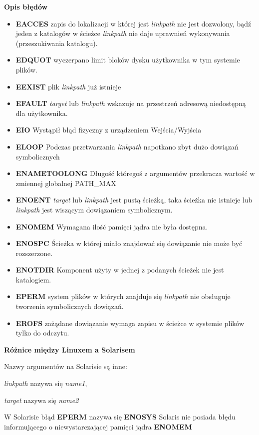\documentclass{article}
\begin{document}
\textbf{Opis błędów}
\begin{itemize}
\item \textbf{EACCES} zapis do lokalizacji w której jest \textit{linkpath} nie jest dozwolony, bądź jeden z katalogów w ścieżce \textit{linkpath} nie daje uprawnień wykonywania (przeszukiwania katalogu).
\item \textbf{EDQUOT} wyczerpano limit bloków dysku użytkownika w tym systemie plików.
\item \textbf{EEXIST} plik \textit{linkpath} już istnieje
\item \textbf{EFAULT} \textit{target} lub  \textit{linkpath} wskazuje na przestrzeń adresową niedostępną dla użytkownika.
\item \textbf{EIO} Wystąpił błąd fizyczny z urządzeniem Wejścia/Wyjścia
\item \textbf{ELOOP} Podczas przetwarzania \textit{linkpath} napotkano zbyt dużo dowiązań symbolicznych
\item \textbf{ENAMETOOLONG} Długość któregoś z argumentów 
przekracza wartość w zmiennej globalnej PATH\_MAX
\item \textbf{ENOENT}  \textit{target} lub \textit{linkpath} jest pustą ścieżką, taka ścieżka nie istnieje lub \textit{linkpath} jest wiszącym dowiązaniem symbolicznym. 
\item \textbf{ENOMEM}  Wymagana ilość pamięci jądra nie była dostępna.
\item \textbf{ENOSPC}  Ścieżka w której miało znajdować się dowiązanie nie może być rozszerzone.
\item \textbf{ENOTDIR}  Komponent użyty w jednej z podanych ścieżek nie jest katalogiem.
\item \textbf{EPERM} system plików w których znajduje się \textit{linkpath} nie obsługuje tworzenia symbolicznych dowiązań.
\item \textbf{EROFS} zażądane dowiązanie wymaga zapisu w ścieżce w systemie plików tylko do odczytu.



\end{itemize}
\textbf{Różnice między Linuxem a Solarisem}


Nazwy argumentów na Solarisie są inne:

\textit{linkpath} nazywa się \textit{name1},

\textit{target} nazywa się \textit{name2}

W Solarisie  błąd \textbf{EPERM} nazywa się \textbf{ENOSYS}
Solaris nie posiada błędu informującego o niewystarczającej pamięci jądra \textbf{ENOMEM}
\end{document}
